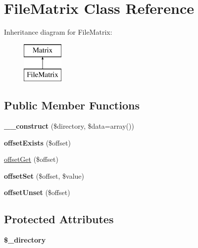 \hypertarget{classFileMatrix}{
\section{FileMatrix Class Reference}
\label{classFileMatrix}
}
Inheritance diagram for FileMatrix:\begin{figure}[H]
\begin{center}
\leavevmode
\includegraphics[height=2.000000cm]{classFileMatrix}
\end{center}
\end{figure}
\subsection*{Public Member Functions}
\begin{DoxyCompactItemize}
\item 
\hypertarget{classFileMatrix_a8fd49d801cf3714544267142030e0dec}{
{\bfseries \_\-\_\-construct} (\$directory, \$data=array())}
\label{classFileMatrix_a8fd49d801cf3714544267142030e0dec}

\item 
\hypertarget{classFileMatrix_aa553b9db2a4c33df0b034a86f04edaf6}{
{\bfseries offsetExists} (\$offset)}
\label{classFileMatrix_aa553b9db2a4c33df0b034a86f04edaf6}

\item 
\hyperlink{classFileMatrix_a0bd0b2818c4319b502c494d638525921}{offsetGet} (\$offset)
\item 
\hypertarget{classFileMatrix_a9e986f6aaa0e0871b5a0528025d6ccb9}{
{\bfseries offsetSet} (\$offset, \$value)}
\label{classFileMatrix_a9e986f6aaa0e0871b5a0528025d6ccb9}

\item 
\hypertarget{classFileMatrix_ac6479825abc7263f875afaf168740e98}{
{\bfseries offsetUnset} (\$offset)}
\label{classFileMatrix_ac6479825abc7263f875afaf168740e98}

\end{DoxyCompactItemize}
\subsection*{Protected Attributes}
\begin{DoxyCompactItemize}
\item 
\hypertarget{classFileMatrix_ab5f78792ad304b276f3b96ff9efdd762}{
{\bfseries \$\_\-directory}}
\label{classFileMatrix_ab5f78792ad304b276f3b96ff9efdd762}

\end{DoxyCompactItemize}


